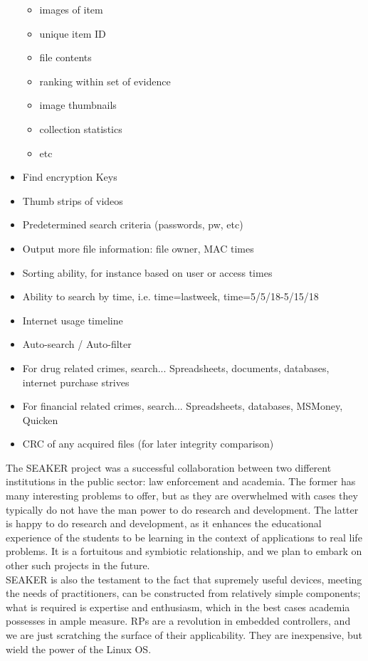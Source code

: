 \documentclass[12pt]{article}
\begin{document}
\begin{itemize}
\begin{itemize}
    \item images of item
    \item unique item ID
    \item file contents
    \item ranking within set of evidence
    \item image thumbnails
    \item collection statistics
    \item etc
  \end{itemize}
  \item Find encryption Keys 
  \item Thumb strips of videos
  \item Predetermined search criteria (passwords, pw, etc)
  \item Output more file information: file owner, MAC times
  \item Sorting ability, for instance based on user or access times
  \item Ability to search by time, i.e. time=lastweek, time=5/5/18-5/15/18
  \item Internet usage timeline
  \item Auto-search / Auto-filter
  \item For drug related crimes, search... Spreadsheets, documents, databases, internet purchase strives
  \item For financial related crimes, search... Spreadsheets, databases, MSMoney, Quicken
  \item CRC of any acquired files (for later integrity comparison)
\end{itemize}
\vspace{0.5 cm}

The SEAKER project was a successful collaboration between two different institutions in the public
sector: law enforcement and academia. The former has many interesting problems to offer, but as they
are overwhelmed with cases they typically do not have the man power to do research and development.
The latter is happy to do research and development, as it enhances the educational experience of the students to be learning
in the context of applications to real life problems. It is a fortuitous and symbiotic relationship, and we
plan to embark on other such projects in the future.\\

SEAKER is also the testament to the fact that supremely useful devices, meeting the needs of
practitioners, can be constructed from relatively simple components; what is required is expertise and
enthusiasm, which in the best cases academia possesses in ample measure. RPs are a revolution in
embedded controllers, and we are just scratching the surface of their applicability. They are inexpensive,
but wield the power of the Linux OS.\\
\end{document}
